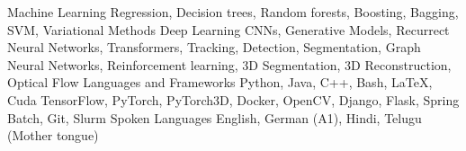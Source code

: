 \begin{cvskills}
    \cvskill
    {Machine Learning} %
    {Regression, Decision trees, Random forests, Boosting, Bagging, SVM,
    Variational Methods} %
    \cvskill
    {Deep Learning} %
    {CNNs, Generative Models, Recurrect Neural Networks, Transformers, Tracking,
    Detection, Segmentation, \linebreak Graph Neural Networks, Reinforcement
    learning, 3D Segmentation, 3D Reconstruction, Optical Flow} %
    \cvskill
    {Languages and \linebreak Frameworks} %
    {Python, Java, C++, Bash, \LaTeX, Cuda \linebreak TensorFlow, PyTorch, PyTorch3D,
    Docker, OpenCV, Django, Flask, Spring Batch, Git, Slurm} %
    \cvskill
    {Spoken Languages} %
    {English, German (A1), Hindi, Telugu (Mother tongue)} %
\end{cvskills}
